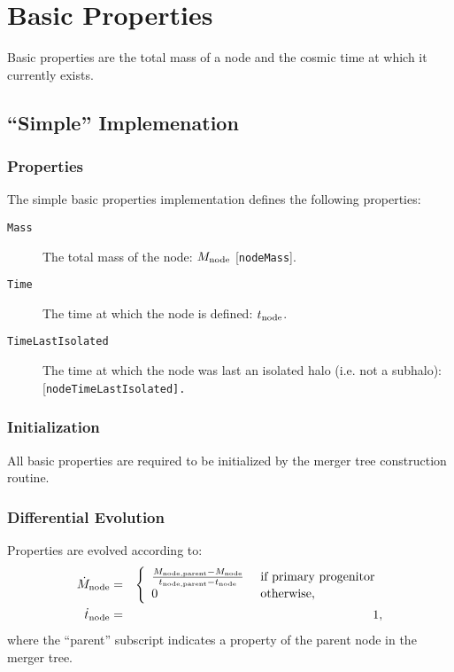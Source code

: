 \section{Basic Properties}\label{sec:ComponentBasicProperties}

Basic properties are the total mass of a node and the cosmic time at which it currently exists.

\subsection{``Simple'' Implemenation}

\subsubsection{Properties}

The simple basic properties implementation defines the following properties:
\begin{description}
 \item [{\tt Mass}] The total mass of the node: $M_{\rm node}$ [{\tt nodeMass}].
 \item [{\tt Time}] The time at which the node is defined: $t_{\rm node}$.
 \item [{\tt TimeLastIsolated}] The time at which the node was last an isolated halo (i.e. not a subhalo): [\tt nodeTimeLastIsolated].
\end{description}

\subsubsection{Initialization}

All basic properties are required to be initialized by the merger tree construction routine.

\subsubsection{Differential Evolution}

Properties are evolved according to:
\begin{eqnarray}
 \dot{M}_{\rm node} &=& \left\{\begin{array}{ll}{M_{\rm node, parent} - M_{\rm node} \over t_{\rm node, parent} - t_{\rm node}} & \hbox{ if primary progenitor} \\ 0 & \hbox{ otherwise}, \end{array} \right. \\
 \dot{t}_{\rm node} &=& 1,
\end{eqnarray}
where the ``parent'' subscript indicates a property of the parent node in the merger tree.

